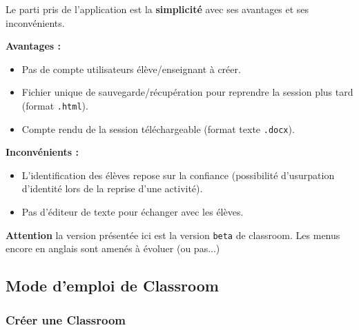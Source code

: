\begin{remarque}
    Le parti pris de l'application est la \textbf{simplicité} avec ses avantages et ses inconvénients.

\begin{multicols*}{2} 

    \textbf{Avantages : }
    \begin{itemize}
        \item Pas de compte utilisateurs élève/enseignant à créer.
        \item Fichier unique de sauvegarde/récupération pour reprendre la session plus tard (format \texttt{.html}).
        \item Compte rendu de la session téléchargeable (format texte \texttt{.docx}).
    \end{itemize}

\columnbreak

    \textbf{Inconvénients :}
    \begin{itemize}
        \item L'identification des élèves repose sur la confiance (possibilité d'usurpation d'identité lors de la reprise d'une activité).
        \item Pas d'éditeur de texte pour échanger avec les élèves.
    \end{itemize}

\end{multicols*}



\end{remarque}


\begin{remarque}
\textbf{Attention} la version présentée ici est la version \texttt{beta} de classroom. Les menus encore en anglais sont amenés à évoluer (ou pas...)
\end{remarque}


\newpage
\subsection{Mode d'emploi de Classroom}

\subsubsection{Créer une Classroom}

